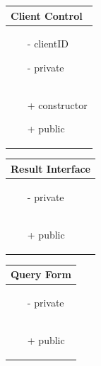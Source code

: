 \documentclass[]{article}
\begin{document}
\begin{table}[H]
\centering %
\begin{tabular}{|>{\centering\arraybackslash}p{10cm}|} %
\hline
Client Control\\
\hline
\begin{itemize}
\item[-] clientID
\item[-] private
\end{itemize}
\\
\hline
\begin{itemize}
\item[+] constructor
\item[+] public
\end{itemize}
\\
\hline
\end{tabular}
\end{table}
%
\begin{table}[H]
\centering
\begin{tabular}{|>{\centering\arraybackslash}p{10cm}|}
\hline
Result Interface\\
\hline
\begin{itemize}
\item[-] private
\end{itemize}
\\
\hline
\begin{itemize}
\item[+] public
\end{itemize}
\\
\hline
\end{tabular}
\end{table}
%
\begin{table}[H]
\centering
\begin{tabular}{|>{\centering\arraybackslash}p{10cm}|}
\hline
Query Form\\
\hline
\begin{itemize}
\item[-] private
\end{itemize}
\\
\hline
\begin{itemize}
\item[+] public
\end{itemize}
\\
\hline
\end{tabular}
\end{table}
%
\end{document}
